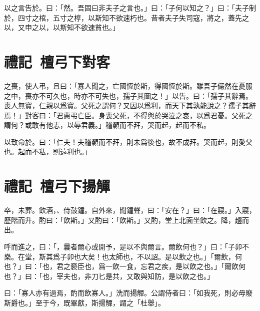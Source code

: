 以之言告於。曰：「然。吾固曰非夫子之言也。」曰：「子何以知之？」曰：「夫子制於，四寸之棺，五寸之椁，以斯知不欲速朽也。昔者夫子失司寇，將之，蓋先之以，又申之以，以斯知不欲速貧也。」

\section[公子重耳對秦客\quad{\small 禮記 檀弓下}]{{\normalsize 禮記\ 檀弓下}\quad {}對客}
之喪，使人弔，且曰：「寡人聞之，亡國恆於斯，得國恆於斯。雖吾子儼然在憂服之中，喪亦不可久也，時亦不可失也，孺子其圖之！」以告。曰：「孺子其辭焉。喪人無寶，仁親以爲寶。父死之謂何？又因以爲利，而天下其孰能說之？孺子其辭焉！」對客曰：「君惠弔亡臣。身喪父死，不得與於哭泣之哀，以爲君憂。父死之謂何？或敢有他志，以辱君義。」稽顙而不拜，哭而起，起而不私。

以致命於。曰：「仁夫！夫稽顙而不拜，則未爲後也，故不成拜。哭而起，則愛父也。起而不私，則遠利也。」

\section[杜蕢揚觶\quad{\small 禮記 檀弓下}]{{\normalsize 禮記\ 檀弓下}\quad {}揚觶}
卒，未葬。飲酒，、侍鼓鐘。自外來，聞鐘聲，曰：「安在？」曰：「在寢。」入寢，歷階而升。酌曰：「飲斯。」又酌曰：「飲斯。」又酌，堂上北面坐飲之。降，趨而出。

呼而進之，曰：「，曩者爾心或開予，是以不與爾言。爾飲何也？」曰：「子卯不樂。在堂，斯其爲子卯也大矣！也太師也，不以詔。是以飲之也。」「爾飲，何也？」曰：「也，君之褻臣也，爲一飲一食，忘君之疾，是以飲之也。」「爾飲何也？」曰：「也，宰夫也，非刀匕是共，又敢與知防，是以飲之也。」

曰：「寡人亦有過焉，酌而飲寡人。」洗而揚觶。公謂侍者曰：「如我死，則必毋廢斯爵也。」至于今，既畢獻，斯揚觶，謂之「杜舉」。

